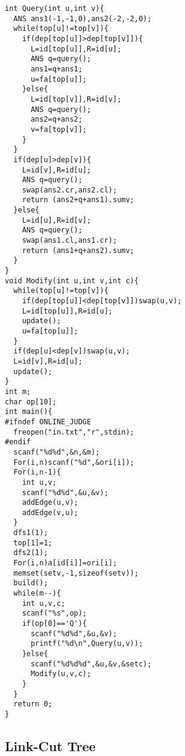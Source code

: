 \begin{lstlisting}
int Query(int u,int v){
  ANS ans1(-1,-1,0),ans2(-2,-2,0);
  while(top[u]!=top[v]){
    if(dep[top[u]]>dep[top[v]]){
      L=id[top[u]],R=id[u];
      ANS q=query();
      ans1=q+ans1;
      u=fa[top[u]];
    }else{
      L=id[top[v]],R=id[v];
      ANS q=query();
      ans2=q+ans2;
      v=fa[top[v]];
    }
  }
  if(dep[u]>dep[v]){
    L=id[v],R=id[u];
    ANS q=query();
    swap(ans2.cr,ans2.cl);
    return (ans2+q+ans1).sumv;
  }else{
    L=id[u],R=id[v];
    ANS q=query();
    swap(ans1.cl,ans1.cr);
    return (ans1+q+ans2).sumv;
  }
}
void Modify(int u,int v,int c){
  while(top[u]!=top[v]){
    if(dep[top[u]]<dep[top[v]])swap(u,v);
    L=id[top[u]],R=id[u];
    update();
    u=fa[top[u]];
  }
  if(dep[u]<dep[v])swap(u,v);
  L=id[v],R=id[u];
  update();
}
int m;
char op[10];
int main(){
#ifndef ONLINE_JUDGE
  freopen("in.txt","r",stdin);
#endif
  scanf("%d%d",&n,&m);
  For(i,n)scanf("%d",&ori[i]);
  For(i,n-1){
    int u,v;
    scanf("%d%d",&u,&v);
    addEdge(u,v);
    addEdge(v,u);
  }
  dfs1(1);
  top[1]=1;
  dfs2(1);
  For(i,n)a[id[i]]=ori[i];
  memset(setv,-1,sizeof(setv));
  build();
  while(m--){
    int u,v,c;
    scanf("%s",op);
    if(op[0]=='Q'){
      scanf("%d%d",&u,&v);
      printf("%d\n",Query(u,v));
    }else{
      scanf("%d%d%d",&u,&v,&setc);
      Modify(u,v,c);
    }
  }
  return 0;
}

\end{lstlisting}

\subsection{Link-Cut Tree}

